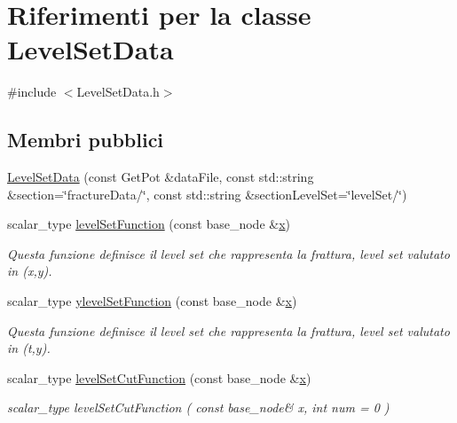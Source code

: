 \hypertarget{classLevelSetData}{\section{Riferimenti per la classe Level\-Set\-Data}
\label{classLevelSetData}
}


{\ttfamily \#include $<$Level\-Set\-Data.\-h$>$}

\subsection*{Membri pubblici}
\begin{DoxyCompactItemize}
\item 
\hyperlink{classLevelSetData_a8b2ab7808f47d9a951327891d65e84be}{Level\-Set\-Data} (const Get\-Pot \&data\-File, const std\-::string \&section=\char`\"{}fracture\-Data/\char`\"{}, const std\-::string \&section\-Level\-Set=\char`\"{}level\-Set/\char`\"{})
\item 
scalar\-\_\-type \hyperlink{classLevelSetData_a665241939c12bad26face4d997e655ce}{level\-Set\-Function} (const base\-\_\-node \&\hyperlink{risultati__bastian_8m_a9336ebf25087d91c818ee6e9ec29f8c1}{x})
\begin{DoxyCompactList}\small\item\em Questa funzione definisce il level set che rappresenta la frattura, level set valutato in (x,y). \end{DoxyCompactList}\item 
scalar\-\_\-type \hyperlink{classLevelSetData_a732ae59581206d4f94237e54bc0071e3}{ylevel\-Set\-Function} (const base\-\_\-node \&\hyperlink{risultati__bastian_8m_a9336ebf25087d91c818ee6e9ec29f8c1}{x})
\begin{DoxyCompactList}\small\item\em Questa funzione definisce il level set che rappresenta la frattura, level set valutato in (t,y). \end{DoxyCompactList}\item 
scalar\-\_\-type \hyperlink{classLevelSetData_a60ea6aa9991dfdae4e4a3950ed8db66c}{level\-Set\-Cut\-Function} (const base\-\_\-node \&\hyperlink{risultati__bastian_8m_a9336ebf25087d91c818ee6e9ec29f8c1}{x})
\begin{DoxyCompactList}\small\item\em scalar\-\_\-type level\-Set\-Cut\-Function ( const base\-\_\-node\& x, int num = 0 ) \end{DoxyCompactList}\item 

\end{DoxyCompactItemize}

